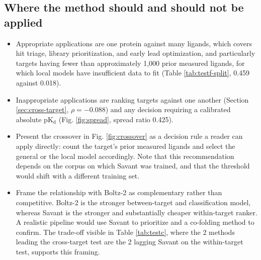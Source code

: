 \documentclass[11pt]{article}
\newcommand{\pkd}{\ensuremath{\mathrm{pK_d}}}
\begin{document}
\subsection*{Where the method should and should not be applied}
\begin{itemize}
  \item Appropriate applications are one protein against many ligands, which
        covers hit triage, library prioritization, and early lead optimization,
        and particularly targets having fewer than approximately 1,000 prior
        measured ligands, for which local models have insufficient data to fit
        (Table \ref{tab:testf-split}, 0.459 against 0.018).
  \item Inappropriate applications are ranking targets against one another
        (Section \ref{sec:cross-target}, $\rho = -0.088$) and any decision
        requiring a calibrated absolute \pkd{} (Fig. \ref{fig:spread}, spread
        ratio 0.425).
  \item Present the crossover in Fig. \ref{fig:crossover} as a decision rule a
        reader can apply directly: count the target's prior measured ligands
        and select the general or the local model accordingly. Note that this
        recommendation depends on the corpus on which Savant was trained, and
        that the threshold would shift with a different training set.
  \item Frame the relationship with Boltz-2 as complementary rather than
        competitive. Boltz-2 is the stronger between-target and classification
        model, whereas Savant is the stronger and substantially cheaper
        within-target ranker. A realistic pipeline would use Savant to
        prioritize and a co-folding method to confirm. The trade-off visible in
        Table \ref{tab:testc}, where the 2 methods leading the cross-target
        test are the 2 lagging Savant on the within-target test, supports this
        framing.
\end{itemize}
\end{document}
